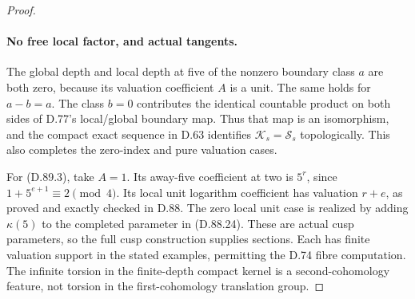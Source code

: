 \begin{proof}
\paragraph{No free local factor, and actual tangents.}
The global depth and local depth at five of the nonzero
boundary class \(a\) are both zero, because its valuation
coefficient \(A\) is a unit. The same holds for \(a-b=a\).
The class \(b=0\) contributes the identical countable
product on both sides of D.77's local/global boundary map.
Thus that map is an isomorphism, and the compact exact
sequence in D.63 identifies \(\mathcal K_s=\mathcal S_s\)
topologically. This also completes the zero-index and pure
valuation cases.

For (D.89.3), take \(A=1\). Its away-five coefficient
at two is \(5^r\), since \(1+5^{e+1}\equiv2\pmod4\).
Its local unit logarithm coefficient has valuation \(r+e\),
as proved and exactly checked in D.88. The zero local unit
case is realized by adding \(\kappa(5)\) to the completed
parameter in (D.88.24). These are actual cusp parameters,
so the full cusp construction supplies sections. Each has
finite valuation support in the stated examples, permitting
the D.74 fibre computation. The infinite torsion in the
finite-depth compact kernel is a second-cohomology feature,
not torsion in the first-cohomology translation group.
\end{proof}
